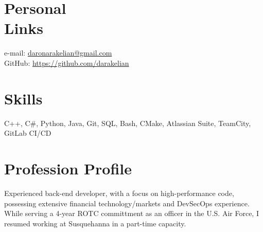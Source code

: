 \documentclass[margin,line]{resume}
\begin{document}
\begin{resume}

    \section{\mysidestyle Personal\\Links}
    \hfill e-mail: \href{mailto://daronarakelian@gmail.com}{daronarakelian@gmail.com} \vspace{0mm}\\\vspace{0mm}%
    \hfill GitHub: \url{https://github.com/darakelian} \vspace{0mm}\\\vspace{-4.5mm}%

    \section{\mysidestyle Skills} 
    C++, C\#, Python, Java, Git, SQL, Bash, CMake, Atlassian Suite, TeamCity, GitLab CI/CD

    \section{\mysidestyle Profession Profile}
    Experienced back-end developer, with a focus on high-performance code, possessing extensive financial technology/markets and DevSecOps experience. While serving a 4-year ROTC committment as an officer in the U.S. Air Force, I resumed working at Susquehanna in a part-time capacity.
  

\end{resume}
\end{document}
